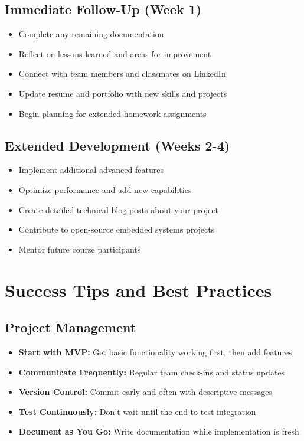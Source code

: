 \documentclass[11pt,a4paper]{article}
\begin{document}
\subsection{Immediate Follow-Up (Week 1)}
\begin{itemize}
    \item Complete any remaining documentation
    \item Reflect on lessons learned and areas for improvement
    \item Connect with team members and classmates on LinkedIn
    \item Update resume and portfolio with new skills and projects
    \item Begin planning for extended homework assignments
\end{itemize}

\subsection{Extended Development (Weeks 2-4)}
\begin{itemize}
    \item Implement additional advanced features
    \item Optimize performance and add new capabilities
    \item Create detailed technical blog posts about your project
    \item Contribute to open-source embedded systems projects
    \item Mentor future course participants
\end{itemize}

\section{Success Tips and Best Practices}

\subsection{Project Management}
\begin{itemize}
    \item \textbf{Start with MVP:} Get basic functionality working first, then add features
    \item \textbf{Communicate Frequently:} Regular team check-ins and status updates
    \item \textbf{Version Control:} Commit early and often with descriptive messages
    \item \textbf{Test Continuously:} Don't wait until the end to test integration
    \item \textbf{Document as You Go:} Write documentation while implementation is fresh
\end{itemize}
\end{document}
